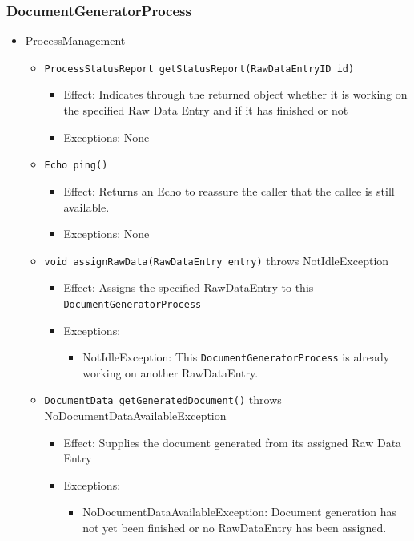 \documentclass[a4paper,10pt]{article}
\begin{document}
\subsubsection*{DocumentGeneratorProcess}
\begin{itemize}
	\item ProcessManagement
	\begin{itemize}
		\item \texttt{ProcessStatusReport getStatusReport(RawDataEntryID id)}
		\begin{itemize}
			\item Effect: Indicates through the returned object whether it is working on the specified Raw Data Entry and if it has finished or not
			\item Exceptions: None
		\end{itemize}
		
		\item \texttt{Echo ping()}
		\begin{itemize}
			\item Effect: Returns an Echo to reassure the caller that the callee is still available.
			\item Exceptions: None
		\end{itemize}
		
		\item \texttt{void assignRawData(RawDataEntry entry)} throws NotIdleException
		\begin{itemize}
			\item Effect: Assigns the specified RawDataEntry to this \texttt{DocumentGeneratorProcess}
			\item Exceptions: 
			\begin{itemize}
				\item NotIdleException: This \texttt{DocumentGeneratorProcess} is already working on another RawDataEntry.
			\end{itemize}
		\end{itemize}
		
		\item \texttt{DocumentData getGeneratedDocument()} throws NoDocumentDataAvailableException
		\begin{itemize}
			\item Effect: Supplies the document generated from its assigned Raw Data Entry
			\item Exceptions: 
			\begin{itemize}
				\item NoDocumentDataAvailableException: Document generation has not yet been finished or no RawDataEntry has been assigned.
			\end{itemize}
		\end{itemize}
	\end{itemize}
\end{itemize}
\end{document}
